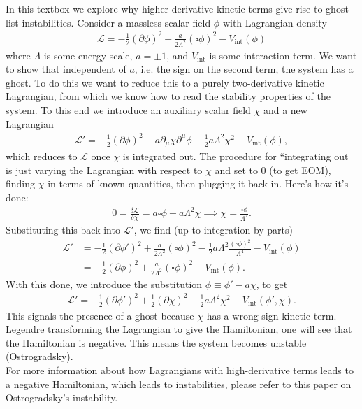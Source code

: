 \documentclass{book}
\theoremstyle{definition}
\newcommand{\p}{\partial}
\newcommand{\lag}{\mathcal{L}}
\newcommand{\nn}{\nonumber}
\newcommand{\f}[2]{\frac{#1}{#2}}
\begin{document}
\begin{framed}
	In this textbox we explore why higher derivative kinetic terms give rise to ghost-list instabilities. Consider a massless scalar field $\phi$ with Lagrangian density
	\begin{align}
	\lag = -\f{1}{2}(\p \phi)^2 + \f{a}{2\Lambda^2}(\square  \phi)^2 - V_{\text{int}}(\phi)
	\end{align}
	where $\Lambda$ is some energy scale, $a = \pm 1$, and $V_{\text{int}}$ is some interaction term. We want to show that independent of $a$, i.e. the sign on the second term, the system has a ghost. To do this we want to reduce this to a purely two-derivative kinetic Lagrangian, from which we know how to read the stability properties of the system. To this end we introduce an auxiliary scalar field $\chi$ and a new Lagrangian 
	\begin{align}
	\lag' = -\f{1}{2}(\p \phi)^2 - a\p_\mu \chi \p^\mu \phi - \f{1}{2}a\Lambda^2 \chi^2 - V_\text{int}(\phi),
	\end{align}
	which reduces to $\lag$ once $\chi$ is integrated out. The procedure for ``integrating out is just varying the Lagrangian with respect to $\chi$ and set to 0 (to get EOM), finding $\chi$ in terms of known quantities, then plugging it back in. Here's how it's done:
	\begin{align}
	0 = \f{\delta \lag}{\delta \chi} = a\square \phi - a \Lambda^2 \chi \implies \chi = \f{\square \phi}{\Lambda^2}.
	\end{align}	
	Substituting this back into $\lag'$, we find (up to integration by parts) 
	\begin{align}
	\lag' &= -\f{1}{2}(\p \phi')^2 + \f{a}{2\Lambda^2}(\square \phi)^2 - \f{1}{2}a\Lambda^2\f{(\square \phi)^2}{\Lambda^4} - V_{\text{int}}(\phi)\nn\\
	&= -\f{1}{2}(\p \phi)^2 + \f{a}{2\Lambda^2}(\square  \phi)^2 - V_{\text{int}}(\phi).
	\end{align} 
	With this done, we introduce the substitution $\phi \equiv \phi' - a\chi$, to get
	\begin{align}
	\lag' = -\f{1}{2}(\p\phi')^2 + \f{1}{2}(\p \chi)^2 - \f{1}{2}a\Lambda^2 \chi^2 - V_\text{int}(\phi',\chi).
	\end{align}
	This signals the presence of a ghost because $\chi$ has a wrong-sign kinetic term. Legendre transforming the Lagrangian to give the Hamiltonian,  one will see that the Hamiltonian is negative. This means the system becomes unstable (Ostrogradsky).  \\
	
	For more information about how Lagrangians with high-derivative terms leads to a negative Hamiltonian, which leads to instabilities, please refer to \href{https://arxiv.org/pdf/1506.02210.pdf}{\underline{this paper}} on Ostrogradsky's instability.
\end{framed}
\end{document}
